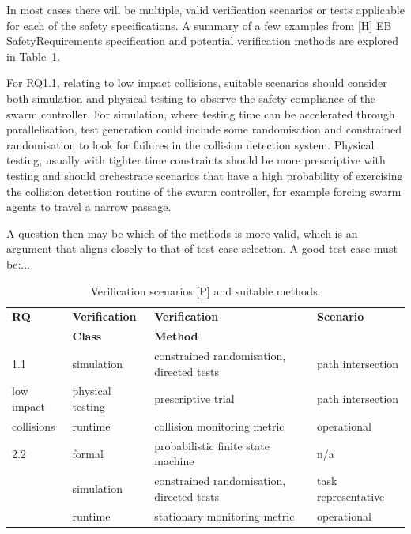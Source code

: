 \documentclass[lettersize,journal]{IEEEtran}
\begin{document}
In most cases there will be multiple, valid verification scenarios or tests applicable for each of the safety specifications. A summary of a few examples from [H] EB SafetyRequirements specification and potential verification methods are explored in Table~\ref{tab:testgen}. 

For RQ1.1, relating to low impact collisions, suitable scenarios should consider both simulation and physical testing to observe the safety compliance of the swarm controller. For simulation, where testing time can be accelerated through parallelisation, test generation could include some randomisation and constrained randomisation to look for failures in the collision detection system. Physical testing, usually with tighter time constraints should be more prescriptive with testing and should orchestrate scenarios that have a high probability of exercising the collision detection routine of the swarm controller, for example forcing swarm agents to travel a narrow passage. 

A question then may be which of the methods is more valid, which is an argument that aligns closely to that of test case selection. A good test case \cite{Fewster1999} must be:...


\begin{table}[t]
\caption{Verification scenarios [P] and suitable methods.}\label{tab:testgen}
\centering
\begin{tabular}{llll}

\textbf{RQ}  & \textbf{Verification}  & \textbf{Verification} & \textbf{Scenario} \\ 
             & \textbf{Class}  	      & \textbf{Method}		  & 		          \\ 
\hline
1.1 		  & simulation 	   & constrained randomisation, directed tests & path intersection     \\
low impact    & physical testing & prescriptive trial 				       & path intersection	 \\
collisions    & runtime		   & collision monitoring metric 		       & operational		 \\
\hline
2.2 & formal 	 	   & probabilistic finite state machine 	   & n/a      \\
	& simulation 	   & constrained randomisation, directed tests & task representative     \\
    & runtime		   & stationary monitoring metric 			   & operational		 \\
\hline
\end{tabular}
\end{table}
\end{document}
